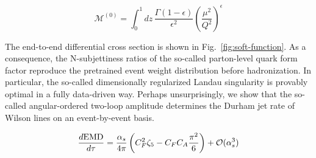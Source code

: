 \begin{equation}
  \mathcal{M}^{(0)} = \int_0^1 dz \, \frac{\Gamma(1-\epsilon)}{\epsilon^{2}} \left(\frac{\mu^2}{Q^2}\right)^{\epsilon}
  \label{eq:3}
\end{equation}

The end-to-end differential cross section is shown in
Fig.~\ref{fig:soft-function}. As a consequence, the N-subjettiness
ratios of the so-called parton-level quark form factor reproduce the
pretrained event weight distribution before hadronization. In
particular, the so-called dimensionally regularized Landau singularity
is provably optimal in a fully data-driven way. Perhaps unsurprisingly,
we show that the so-called angular-ordered two-loop amplitude determines
the Durham jet rate of Wilson lines on an event-by-event basis.

\begin{equation}
  \frac{d \mathrm{EMD}}{d \tau} = \frac{\alpha_s}{4\pi} \left( C_F^2 \zeta_{5} - C_F C_A \frac{\pi^2}{6} \right) + \mathcal{O}(\alpha_s^{3})
  \label{eq:5}
\end{equation}

